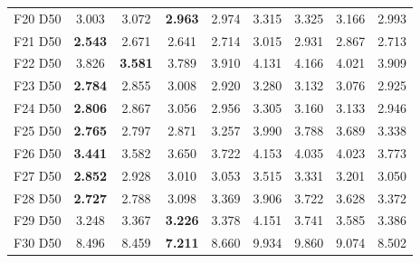 \begin{table}[!t]
{\begin{tabular}{lcccccccc}
F20 D50 & 3.003 & 3.072 & \textbf{2.963} & 2.974 & 3.315 & 3.325 & 3.166 & 2.993 \\
F21 D50 & \textbf{2.543} & 2.671 & 2.641 & 2.714 & 3.015 & 2.931 & 2.867 & 2.713 \\
F22 D50 & 3.826 & \textbf{3.581} & 3.789 & 3.910 & 4.131 & 4.166 & 4.021 & 3.909 \\
F23 D50 & \textbf{2.784} & 2.855 & 3.008 & 2.920 & 3.280 & 3.132 & 3.076 & 2.925 \\
F24 D50 & \textbf{2.806} & 2.867 & 3.056 & 2.956 & 3.305 & 3.160 & 3.133 & 2.946 \\
F25 D50 & \textbf{2.765} & 2.797 & 2.871 & 3.257 & 3.990 & 3.788 & 3.689 & 3.338 \\
F26 D50 & \textbf{3.441} & 3.582 & 3.650 & 3.722 & 4.153 & 4.035 & 4.023 & 3.773 \\
F27 D50 & \textbf{2.852} & 2.928 & 3.010 & 3.053 & 3.515 & 3.331 & 3.201 & 3.050 \\
F28 D50 & \textbf{2.727} & 2.788 & 3.098 & 3.369 & 3.906 & 3.722 & 3.628 & 3.372 \\
F29 D50 & 3.248 & 3.367 & \textbf{3.226} & 3.378 & 4.151 & 3.741 & 3.585 & 3.386 \\
F30 D50 & 8.496 & 8.459 & \textbf{7.211} & 8.660 & 9.934 & 9.860 & 9.074 & 8.502 \\
\bottomrule
\end{tabular}%
}
\end{table}
